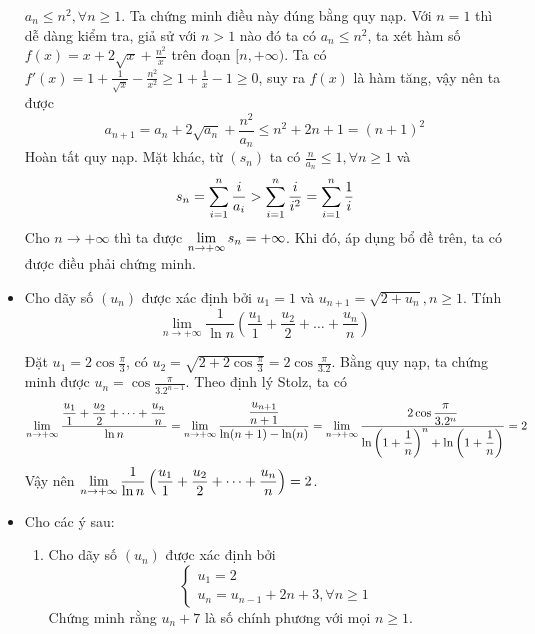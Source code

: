 \documentclass[11pt]{scrartcl}
\begin{document}
\begin{itemize}[label=, leftmargin=0em, itemsep=0.5em]
\begin{sol}
        $a_n \leq n^2, \forall n \geq 1$. Ta chứng minh điều này đúng bằng quy nạp. Với $n = 1$ thì dễ dàng kiểm tra, giả sử với $n > 1$ nào đó ta có $a_n \leq n^2$, ta xét hàm số $f(x) = x + 2\sqrt{x} + \frac{n^2}{x}$ trên đoạn $[n, +\infty)$. Ta có $f'(x) = 1 + \frac{1}{\sqrt{x}} - \frac{n^2}{x^2} \geq 1 + \frac{1}{x} - 1 \geq 0$, suy ra $f(x)$ là hàm tăng, vậy nên ta được 
        \[
        a_{n + 1} = a_n + 2\sqrt{a_n} + \frac{n^2}{a_n} \leq n^2 +2n + 1 = (n + 1)^2
        \]
        Hoàn tất quy nạp. Mặt khác, từ $(s_n)$ ta có $\frac{n}{a_n} \leq 1, \forall n \geq 1$ và \[s_n = \dsum_{i = 1}^n \frac{i}{a_i} > \dsum_{i = 1}^n \frac{i}{i^2} = \dsum_{i = 1}^n \frac{1}{i}\] Cho $n \to +\infty$ thì ta được $\displaystyle\lim_{n \to +\infty} s_n = +\infty$. Khi đó, áp dụng bổ đề trên, ta có được điều phải chứng minh.
    \end{sol}
    \item \begin{bt}
        Cho dãy số $(u_n)$ được xác định bởi $u_1 = 1$ và $u_{n + 1} = \sqrt{2 + u_n}, n \geq 1$. Tính
        \[
            \lim_{n \to + \infty} \frac{1}{\ln n}\left(\frac{u_1}{1} + \frac{u_2}{2} + \dots + \frac{u_n}{n}\right)
        \]
    \end{bt}
    \begin{sol}
        Đặt $u_1 = 2\cos\frac{\pi}{3}$, có $u_2 = \sqrt{2 + 2\cos\frac{\pi}{3} }= 2\cos\frac{\pi}{3.2}$. Bằng quy nạp, ta chứng minh được $u_n = \cos\frac{\pi}{3.2^{n - 1}}$. Theo định lý Stolz, ta có 
        \[
            \lim_{n \to + \infty} \frac{\frac{u_1}{1} + \frac{u_2}{2} + \dots + \frac{u_n}{n}}{\ln n } = \dlim \frac{\frac{u_{n + 1}}{n + 1}}{\ln(n + 1) - \ln(n)}= \dlim \frac{2\cos\frac{\pi}{3.2^{n}}}{\ln\left(1 + \frac{1}{n}\right)^n + \ln\left(1 + \frac{1}{n}\right)} = 2
        \]
        Vậy nên $\dlim \frac{1}{\ln n}\left(\frac{u_1}{1} + \frac{u_2}{2} + \dots + \frac{u_n}{n}\right) = 2$.
    \end{sol}

    \item \begin{btvn} Cho các ý sau:
        \begin{enumerate}
            \item Cho dãy số $(u_n)$ được xác định bởi
            \[\left\{
                \begin{array}{l}
                    u_1 = 2 \\
                    u_n = u_{n - 1} + 2n + 3, \forall n \geq 1 
                \end{array}\right.\]
            Chứng minh rằng $u_n + 7$ là số chính phương với mọi $n \geq 1$.
            

\end{enumerate}
\end{btvn}
\end{itemize}
\end{document}
